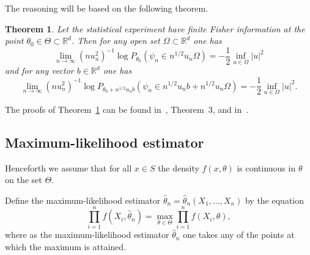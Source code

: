 \documentclass[11pt,a4paper]{article}
\newtheorem{theorem}{Theorem}[section]
\begin{document}
The reasoning will be based on the following theorem.

\begin{theorem}\label{th:LD}
Let the statistical experiment have finite Fisher information at the point $\theta_0\in\Theta\subset\mathbb{R}^d$. Then for any open set $\Omega\subset\mathbb{R}^d$ one has
\begin{equation}
\lim_{n\to\infty}(nu_n^2)^{-1}\log P_{\theta_0}(\psi_n\in n^{1/2}u_n\Omega)=-\frac12\inf_{u\in\Omega}|u|^2
\label{eq:15}
\end{equation}
and for any vector $b\in\mathbb{R}^d$ one has
\begin{equation}
\lim_{n\to\infty}(nu_n^2)^{-1}\log P_{\theta_0+n^{1/2}u_nb}(\psi_n\in n^{1/2}u_nb+n^{1/2}u_n\Omega)=-\frac12\inf_{u\in\Omega}|u|^2.
\label{eq:16}
\end{equation}
\end{theorem}

The proofs of Theorem~\ref{th:LD} can be found in~\cite{6}, Theorem~3, and in~\cite{7}.

\subsection{Maximum-likelihood estimator}

Henceforth we assume that for all $x\in S$ the density $f(x,\theta)$ is continuous in $\theta$ on the set $\Theta$.

Define the maximum-likelihood estimator $\hat\theta_n=\hat\theta_n(X_1,\dots,X_n)$ by the equation
\begin{equation}
\prod_{i=1}^n f(X_i,\hat\theta_n)=\max_{\theta\in\Theta}\prod_{i=1}^n f(X_i,\theta),
\label{eq:MLE}
\end{equation}
where as the maximum-likelihood estimator $\hat\theta_n$ one takes any of the points at which the maximum is attained.
\end{document}
